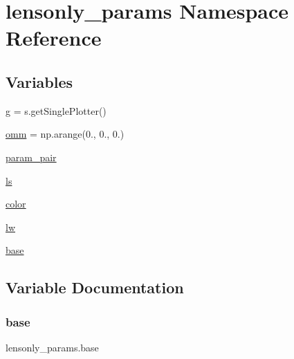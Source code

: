 \hypertarget{namespacelensonly__params}{}\section{lensonly\+\_\+params Namespace Reference}
\label{namespacelensonly__params}
\subsection*{Variables}
\begin{DoxyCompactItemize}
\item 
\mbox{\hyperlink{namespacelensonly__params_a357f3d29f97e9388db02fee7f65e9d4e}{g}} = s.\+get\+Single\+Plotter()
\item 
\mbox{\hyperlink{namespacelensonly__params_a65d7c69c53089f51defef40f312ffa02}{omm}} = np.\+arange(0., 0., 0.)
\item 
\mbox{\hyperlink{namespacelensonly__params_ae9f8279efecd4059538c98f1ae21a2dc}{param\+\_\+pair}}
\item 
\mbox{\hyperlink{namespacelensonly__params_aa5dd2bf8b2686bd12552c638bd3cb04a}{ls}}
\item 
\mbox{\hyperlink{namespacelensonly__params_a8b5969f14a2ba90b289b99966def996e}{color}}
\item 
\mbox{\hyperlink{namespacelensonly__params_ad86208522ed2d535b03c1f51fcbbc4ae}{lw}}
\item 
\mbox{\hyperlink{namespacelensonly__params_a9ade9db7ec82a2bbefcba67037428dbf}{base}}
\end{DoxyCompactItemize}


\subsection{Variable Documentation}
\mbox{\label{namespacelensonly__params_a9ade9db7ec82a2bbefcba67037428dbf}} 
\subsubsection{\texorpdfstring{base}{base}}
{\footnotesize\ttfamily lensonly\+\_\+params.\+base}

\mbox{\label{namespacelensonly__params_a8b5969f14a2ba90b289b99966def996e}} 

